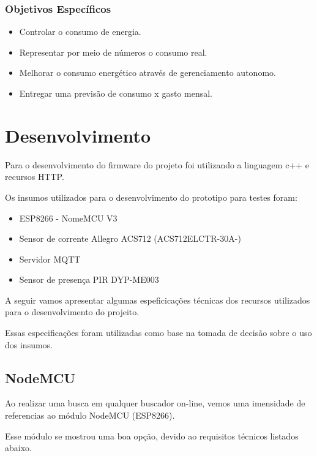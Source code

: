 \documentclass[openright]{normas-utf-tex} %
\begin{document}
\subsection{Objetivos Específicos}

\begin{itemize}
	\item Controlar o consumo de energia.
	\item Representar por meio de números o consumo real. 
	\item Melhorar o consumo energético através de gerenciamento autonomo.
	\item Entregar uma previsão de consumo x gasto mensal.
\end{itemize}


\chapter{Desenvolvimento}
\label{chap:desenv}

 
Para o desenvolvimento do firmware do projeto foi utilizando a linguagem c++   \cite{Altabooks} e recursos HTTP.

Os insumos utilizados para o desenvolvimento do prototipo para testes foram:

\begin{itemize}
       	\item ESP8266 - NomeMCU V3
        \item Sensor de corrente Allegro ACS712 (ACS712ELCTR-30A-)
        \item Servidor MQTT
        \item Sensor de presença PIR DYP-ME003
\end{itemize}

A seguir vamos apresentar algumas espeficicações técnicas dos recursos utilizados para o desenvolvimento do projeito.

Essas especificações foram utilizadas como base na tomada de decisão sobre o uso dos insumos. 

\section{NodeMCU}
Ao realizar uma busca em qualquer buscador on-line, vemos uma imensidade de referencias ao módulo NodeMCU (ESP8266).

Esse módulo se mostrou uma boa opção, devido ao requisitos técnicos listados abaixo.
\end{document}
